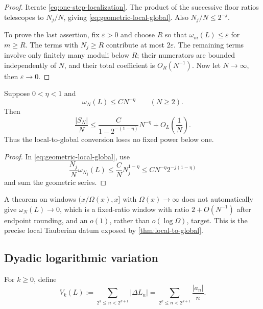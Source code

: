 \begin{proof}
Iterate \eqref{eq:one-step-localization}.  The product of the
successive floor ratios telescopes to \(N_j/N\), giving
\eqref{eq:geometric-local-global}.  Also
\(N_j/N\le2^{-j}\).

To prove the last assertion, fix \(\varepsilon>0\) and choose \(R\)
so that \(\omega_m(L)\le\varepsilon\) for \(m\ge R\).  The terms with
\(N_j\ge R\) contribute at most \(2\varepsilon\).  The remaining
terms involve only finitely many moduli below \(R\); their numerators
are bounded independently of \(N\), and their total coefficient is
\(O_R(N^{-1})\).  Now let \(N\to\infty\), then
\(\varepsilon\to0\).
\end{proof}

\begin{corollary}
\label{cor:power-transfer}
Suppose \(0<\eta<1\) and
\[
 \omega_N(L)\le C N^{-\eta}\qquad(N\ge2).
\]
Then
\begin{equation}
 \frac{|S_N|}{N}
 \le
 \frac{C}{1-2^{-(1-\eta)}}N^{-\eta}
 +O_L\left(\frac1N\right).
\label{eq:power-transfer}
\end{equation}
Thus the local-to-global conversion loses no fixed power below one.
\end{corollary}

\begin{proof}
In \eqref{eq:geometric-local-global}, use
\[
 \frac{N_j}{N}\omega_{N_j}(L)
 \le \frac{C}{N}N_j^{1-\eta}
 \le C N^{-\eta}2^{-j(1-\eta)}
\]
and sum the geometric series.
\end{proof}

\begin{remark}
\label{rem:fixed-ratio-datum}
A theorem on windows \((x/\Omega(x),x]\) with
\(\Omega(x)\to\infty\) does not automatically give
\(\omega_N(L)\to0\), which is a fixed-ratio window with ratio
\(2+O(N^{-1})\) after endpoint rounding, and an \(o(1)\), rather
than \(o(\log\Omega)\), target.  This is
the precise local Tauberian datum exposed by
\cref{thm:local-to-global}.
\end{remark}

\subsection{Dyadic logarithmic variation}

\begin{definition}
\label{def:dyadic-variation}
For \(k\ge0\), define
\begin{equation}
 V_k(L):=
 \sum_{2^k\le n<2^{k+1}}|\Delta L_n|
 =\sum_{2^k\le n<2^{k+1}}\frac{|a_n|}{n}.
\label{eq:dyadic-variation}
\end{equation}
\end{definition}

